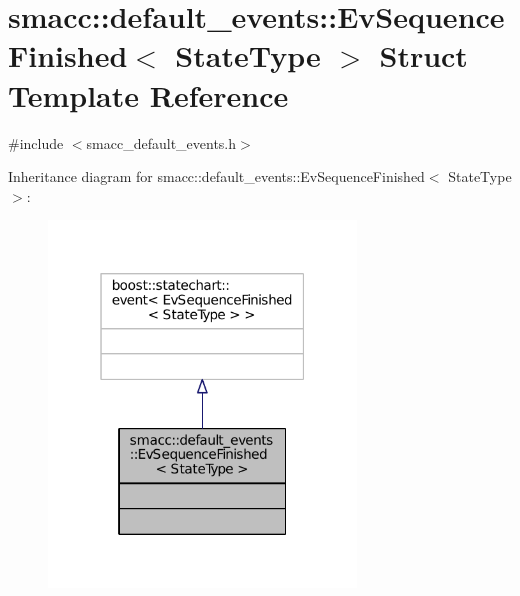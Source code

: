 \hypertarget{structsmacc_1_1default__events_1_1EvSequenceFinished}{}\section{smacc\+:\+:default\+\_\+events\+:\+:Ev\+Sequence\+Finished$<$ State\+Type $>$ Struct Template Reference}
\label{structsmacc_1_1default__events_1_1EvSequenceFinished}


{\ttfamily \#include $<$smacc\+\_\+default\+\_\+events.\+h$>$}



Inheritance diagram for smacc\+:\+:default\+\_\+events\+:\+:Ev\+Sequence\+Finished$<$ State\+Type $>$\+:
\nopagebreak
\begin{figure}[H]
\begin{center}
\leavevmode
\includegraphics[width=232pt]{structsmacc_1_1default__events_1_1EvSequenceFinished__inherit__graph}
\end{center}
\end{figure}


